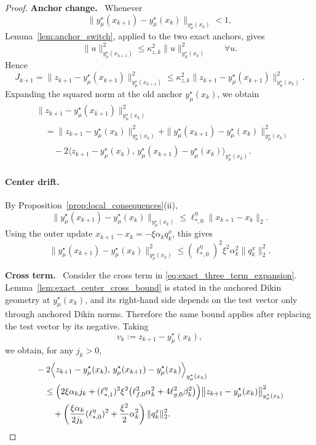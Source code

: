 \documentclass{article}
\newcommand{\proofstep}[1]{\par\smallskip\noindent\textbf{#1}\ }
\begin{document}
\begin{proof}
\proofstep{Anchor change.}
Whenever
\[
\big\|y_\mu^\star(x_{k+1})-y_\mu^\star(x_k)\big\|_{y_\mu^\star(x_k)}<1,
\]
Lemma~\ref{lem:anchor_switch}, applied to the two exact anchors, gives
\[
\|u\|_{y_\mu^\star(x_{k+1})}^2
\le
\kappa_{z,k}^2
\|u\|_{y_\mu^\star(x_k)}^2
\qquad \forall u.
\]
Hence
\begin{equation}
\label{eq:exact_anchor_switch}
J_{k+1}
=
\|z_{k+1}-y_\mu^\star(x_{k+1})\|_{y_\mu^\star(x_{k+1})}^2
\le
\kappa_{z,k}^2
\|z_{k+1}-y_\mu^\star(x_{k+1})\|_{y_\mu^\star(x_k)}^2 .
\end{equation}
Expanding the squared norm at the old anchor \(y_\mu^\star(x_k)\), we obtain
\begin{align}
&\|z_{k+1}-y_\mu^\star(x_{k+1})\|_{y_\mu^\star(x_k)}^2
\nonumber\\
&\quad =
\|z_{k+1}-y_\mu^\star(x_k)\|_{y_\mu^\star(x_k)}^2
+
\|y_\mu^\star(x_{k+1})-y_\mu^\star(x_k)\|_{y_\mu^\star(x_k)}^2
\nonumber\\
&\qquad
-
2
\Big\langle
z_{k+1}-y_\mu^\star(x_k),\,
y_\mu^\star(x_{k+1})-y_\mu^\star(x_k)
\Big\rangle_{y_\mu^\star(x_k)} .
\label{eq:exact_three_term_expansion}
\end{align}

\paragraph{Center drift.}
By Proposition~\ref{prop:local_consequences}\textup{(ii)},
\[
\|y_\mu^\star(x_{k+1})-y_\mu^\star(x_k)\|_{y_\mu^\star(x_k)}
\le
\ell_{*,0}^\eta \|x_{k+1}-x_k\|_2 .
\]
Using the outer update \(x_{k+1}-x_k=-\xi\alpha_k q_k^x\), this gives
\begin{equation}
\label{eq:exact_center_drift_square}
\|y_\mu^\star(x_{k+1})-y_\mu^\star(x_k)\|_{y_\mu^\star(x_k)}^2
\le
(\ell_{*,0}^\eta)^2\xi^2\alpha_k^2\|q_k^x\|_2^2 .
\end{equation}

\proofstep{Cross term.}
Consider the cross term in \eqref{eq:exact_three_term_expansion}. Lemma~\ref{lem:exact_center_cross_bound} is
stated in the anchored Dikin geometry at \(y_\mu^\star(x_k)\), and its right-hand side depends on
the test vector only through anchored Dikin norms. Therefore the same bound applies after replacing
the test vector by its negative. Taking
\[
v_k:=z_{k+1}-y_\mu^\star(x_k),
\]
we obtain, for any \(j_k>0\),
\begin{align}
&-2
\Big\langle
z_{k+1}-y_\mu^\star(x_k),\,
y_\mu^\star(x_{k+1})-y_\mu^\star(x_k)
\Big\rangle_{y_\mu^\star(x_k)}
\nonumber\\
&\quad\le
\Bigl(
2\xi\alpha_k j_k
+
(\ell_{*,1}^\eta)^2\xi^2
\bigl(\ell_{f,0}^2\alpha_k^2+4\ell_{g,0}^2\beta_k^2\bigr)
\Bigr)
\big\|z_{k+1}-y_\mu^\star(x_k)\big\|_{y_\mu^\star(x_k)}^2
\nonumber\\
&\qquad
+
\left(
\frac{\xi\alpha_k}{2j_k}(\ell_{*,0}^\eta)^2
+
\frac{\xi^2}{2}\alpha_k^2
\right)
\|q_k^x\|_2^2 .
\label{eq:exact_cross_term_bound}
\end{align}


\end{proof}
\end{document}
